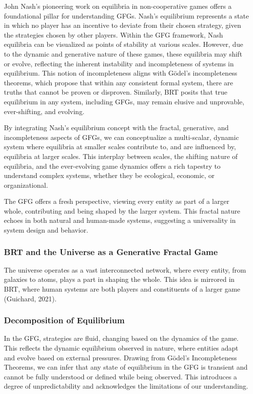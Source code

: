 \documentclass[sn-nature]{sn-jnl}%
\theoremstyle{thmstyleone}%
\theoremstyle{thmstyletwo}%
\theoremstyle{thmstylethree}%
\begin{document}
John Nash's pioneering work on equilibria in non-cooperative games offers a foundational pillar for understanding GFGs\cite{arsenyan_modeling_2015}. Nash's equilibrium\cite{nash_equilibrium_1950} represents a state in which no player has an incentive to deviate from their chosen strategy, given the strategies chosen by other players. Within the GFG framework, Nash equilibria can be visualized as points of stability at various scales. However, due to the dynamic and generative nature of these games, these equilibria may shift or evolve, reflecting the inherent instability and incompleteness of systems in equilibrium. This notion of incompleteness aligns with Gödel's incompleteness theorems, which propose that within any consistent formal system, there are truths that cannot be proven or disproven\cite{zalta_gos_2020}. Similarly, BRT posits that true equilibrium in any system, including GFGs, may remain elusive and unprovable, ever-shifting, and evolving.

By integrating Nash's equilibrium concept with the fractal, generative, and incompleteness aspects of GFGs, we can conceptualize a multi-scalar, dynamic system where equilibria at smaller scales contribute to, and are influenced by, equilibria at larger scales. This interplay between scales, the shifting nature of equilibria, and the ever-evolving game dynamics offers a rich tapestry to understand complex systems, whether they be ecological, economic, or organizational.

The GFG offers a fresh perspective, viewing every entity as part of a larger whole, contributing and being shaped by the larger system. This fractal nature echoes in both natural and human-made systems, suggesting a universality in system design and behavior\cite{mandelbrot_fractal_1982}.

\noindent %




\subsubsection{BRT and the Universe as a Generative Fractal Game}
The universe operates as a vast interconnected network, where every entity, from galaxies to atoms, plays a part in shaping the whole. This idea is mirrored in BRT, where human systems are both players and constituents of a larger game (Guichard, 2021).
\subsubsection{Decomposition of Equilibrium}
In the GFG, strategies are fluid, changing based on the dynamics of the game. This reflects the dynamic equilibrium observed in nature, where entities adapt and evolve based on external pressures\cite{smith_logic_1973}.
Drawing from Gödel's Incompleteness Theorems, we can infer that any state of equilibrium in the GFG is transient and cannot be fully understood or defined while being observed. This introduces a degree of unpredictability and acknowledges the limitations of our understanding\cite{newman_structure_2003}.
\end{document}
